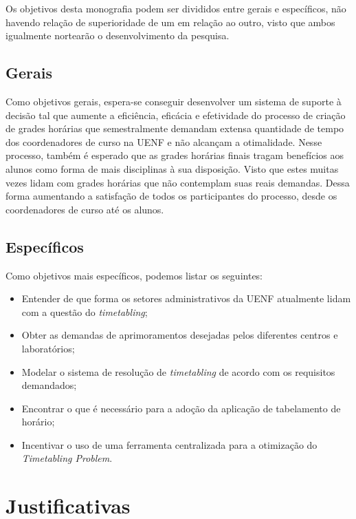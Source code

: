 Os objetivos desta monografia podem ser divididos entre gerais e específicos, não havendo relação de superioridade de um em relação ao outro, visto que ambos igualmente nortearão o desenvolvimento da pesquisa.

\subsection{Gerais} \label{subsec:Gerais}                %

Como objetivos gerais, espera-se conseguir desenvolver um sistema de suporte à decisão tal que aumente a eficiência, eficácia e efetividade do processo de criação de grades horárias que semestralmente demandam extensa quantidade de tempo dos coordenadores de curso na UENF e não alcançam a otimalidade. Nesse processo, também é esperado que as grades horárias finais tragam benefícios aos alunos como forma de mais disciplinas à sua disposição. Visto que estes muitas vezes lidam com grades horárias que não contemplam suas reais demandas. Dessa forma aumentando a satisfação de todos os participantes do processo, desde os coordenadores de curso até os alunos.

\subsection{Específicos} \label{subsec: EspeEspecíficos} %

Como objetivos mais específicos, podemos listar os seguintes:

\begin{itemize}
  \item Entender de que forma os setores administrativos da UENF atualmente lidam com a questão do \textit{timetabling};
  \item Obter as demandas de aprimoramentos desejadas pelos diferentes centros e laboratórios;
  \item Modelar o sistema de resolução de \textit{timetabling} de acordo com os requisitos demandados;
  \item Encontrar o que é necessário para a adoção da aplicação de tabelamento de horário;
  \item Incentivar o uso de uma ferramenta centralizada para a otimização do \textit{Timetabling Problem}.
\end{itemize}

\section{Justificativas} \label{sec:Justificativas}      %


